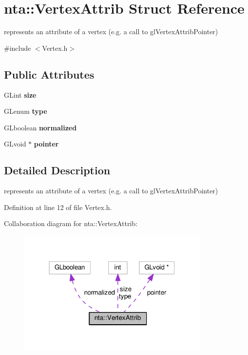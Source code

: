 \hypertarget{structnta_1_1VertexAttrib}{}\section{nta\+:\+:Vertex\+Attrib Struct Reference}
\label{structnta_1_1VertexAttrib}


represents an attribute of a vertex (e.\+g. a call to gl\+Vertex\+Attrib\+Pointer)  




{\ttfamily \#include $<$Vertex.\+h$>$}

\subsection*{Public Attributes}
\begin{DoxyCompactItemize}
\item 
\mbox{\label{structnta_1_1VertexAttrib_afd253a525c4d086bcc2afa66a2d0118e}} 
G\+Lint {\bfseries size}
\item 
\mbox{\label{structnta_1_1VertexAttrib_a625cbe8f28739965a9ec29b9a426465e}} 
G\+Lenum {\bfseries type}
\item 
\mbox{\label{structnta_1_1VertexAttrib_afe78648a02032d5ba376207cf322320a}} 
G\+Lboolean {\bfseries normalized}
\item 
\mbox{\label{structnta_1_1VertexAttrib_a926cbe1d958dd6e72ad7f93e8791d9a4}} 
G\+Lvoid $\ast$ {\bfseries pointer}
\end{DoxyCompactItemize}


\subsection{Detailed Description}
represents an attribute of a vertex (e.\+g. a call to gl\+Vertex\+Attrib\+Pointer) 

Definition at line 12 of file Vertex.\+h.



Collaboration diagram for nta\+:\+:Vertex\+Attrib\+:\nopagebreak
\begin{figure}[H]
\begin{center}
\leavevmode
\includegraphics[width=273pt]{d6/d7d/structnta_1_1VertexAttrib__coll__graph}
\end{center}
\end{figure}


